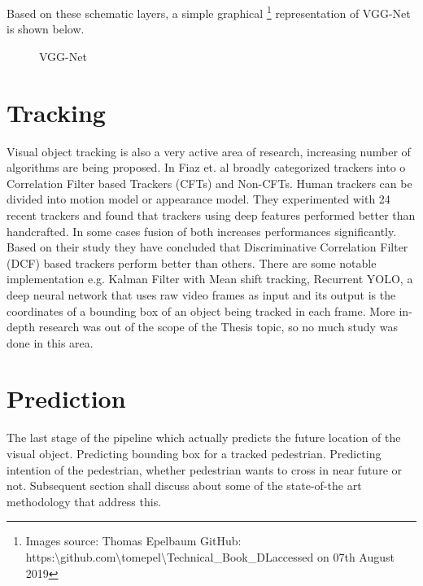 \newpara Based on these schematic layers, a simple graphical \footnote{\label{tomepel} Images source: Thomas Epelbaum GitHub: https:\textbackslash github.com\textbackslash tomepel\textbackslash Technical\_Book\_DLaccessed on 07th August 2019 } representation of VGG-Net is shown below.
\begin{figure}[h]
\begin{center}
\caption{VGG-Net}
\end{center}
\end{figure} 

\section{Tracking}
Visual object tracking is also a very active area of research, increasing number of algorithms are being proposed.
In \cite{fiaz2019handcrafted} Fiaz et. al broadly categorized trackers into o Correlation Filter based Trackers (CFTs) and Non-CFTs. Human trackers can be divided into motion model or appearance model. They experimented with 24 recent trackers and found that trackers using deep features performed better than handcrafted. In some cases fusion of both increases performances significantly. Based on their study they have concluded that Discriminative Correlation Filter (DCF) based trackers perform better than others. There are some notable implementation e.g. 
Kalman Filter with Mean shift tracking, Recurrent YOLO, a deep neural network that uses raw video frames as input and its output is the coordinates of a bounding box of an object being tracked in each frame.
More in-depth research was out of the scope of the Thesis topic, so no much study was done in this area.

\section{Prediction}
The last stage of the pipeline which actually predicts the future location of the visual object. Predicting  bounding box for a tracked pedestrian. Predicting intention of the pedestrian, whether pedestrian wants to cross in near future or not. Subsequent section shall discuss about some of the state-of-the art methodology that address this.

